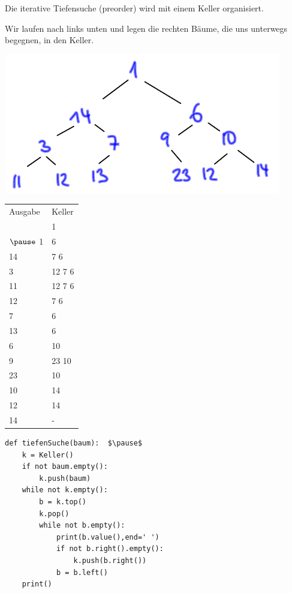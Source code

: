 \documentclass{beamer}
\begin{document}
\begin{frame}[fragile]
\begin{minipage}[c]{7cm}
Die iterative Tiefensuche (preorder) wird mit einem Keller organisiert.  

Wir laufen nach links unten und legen die rechten Bäume, die uns unterwegs begegnen, in den Keller.  

 \includegraphics[scale=0.6]{bild12.png}   


\end{minipage}   \pause
\begin{minipage}[c]{4cm}
\begin{tabular}{l l}

Ausgabe & Keller \\ 
   & 1 \\  $\pause$
1 & 6 \\
14 & 7 6 \\
3 & 12 7 6\\
11 & 12 7 6 \\
12 & 7 6 \\
7 & 6 \\
13 & 6 \\
6 & 10 \\
9 & 23 10 \\
23 & 10 \\
10 & 14 \\
12 & 14 \\
14 & -
\end{tabular}
\end{minipage} 

\end{frame}

\begin{frame}[fragile]
\begin{lstlisting}
def tiefenSuche(baum):  $\pause$
    k = Keller()
    if not baum.empty():
        k.push(baum)
    while not k.empty():
        b = k.top()
        k.pop()
        while not b.empty():
            print(b.value(),end=' ')
            if not b.right().empty():
                k.push(b.right())
            b = b.left()
    print()
\end{lstlisting} 
\end{frame}
\end{document}
